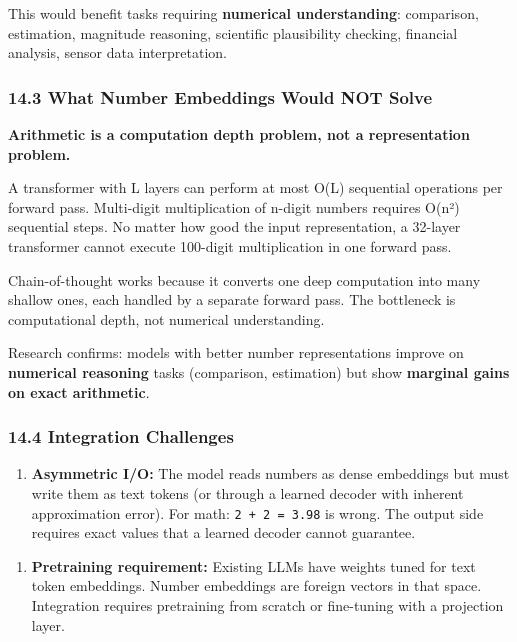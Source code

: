 \documentclass[11pt]{article}
\begin{document}
This would benefit tasks requiring \textbf{numerical understanding}: comparison, estimation, magnitude reasoning, scientific plausibility checking, financial analysis, sensor data interpretation.


\subsubsection*{14.3 What Number Embeddings Would NOT Solve}


\textbf{Arithmetic is a computation depth problem, not a representation problem.}


A transformer with L layers can perform at most O(L) sequential operations per forward pass. Multi-digit multiplication of n-digit numbers requires O(n²) sequential steps. No matter how good the input representation, a 32-layer transformer cannot execute 100-digit multiplication in one forward pass.


Chain-of-thought works because it converts one deep computation into many shallow ones, each handled by a separate forward pass. The bottleneck is computational depth, not numerical understanding.


Research confirms: models with better number representations improve on \textbf{numerical reasoning} tasks (comparison, estimation) but show \textbf{marginal gains on exact arithmetic}.


\subsubsection*{14.4 Integration Challenges}


\begin{enumerate}
\item \textbf{Asymmetric I/O:} The model reads numbers as dense embeddings but must write them as text tokens (or through a learned decoder with inherent approximation error). For math: \texttt{2 + 2 = 3.98} is wrong. The output side requires exact values that a learned decoder cannot guarantee.
\end{enumerate}


\begin{enumerate}
\item \textbf{Pretraining requirement:} Existing LLMs have weights tuned for text token embeddings. Number embeddings are foreign vectors in that space. Integration requires pretraining from scratch or fine-tuning with a projection layer.
\end{enumerate}
\end{document}
